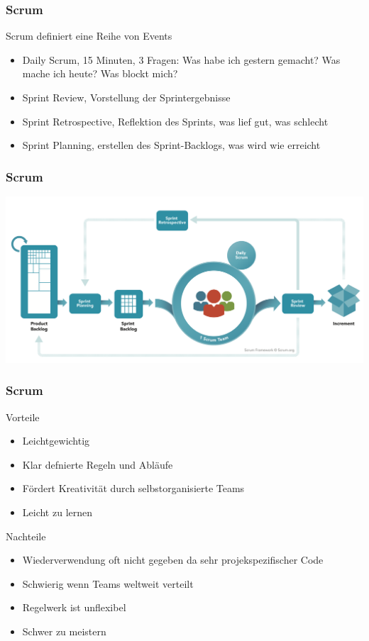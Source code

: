 \begin{frame}
\frametitle{Scrum}
	Scrum definiert eine Reihe von Events
	\begin{itemize}
		\item Daily Scrum, 15 Minuten, 3 Fragen: Was habe ich gestern gemacht? Was mache ich heute? Was blockt mich?
		\item Sprint Review, Vorstellung der Sprintergebnisse
		\item Sprint Retrospective, Reflektion des Sprints, was lief gut, was schlecht
		\item Sprint Planning, erstellen des Sprint-Backlogs, was wird wie erreicht
	\end{itemize}
\end{frame}

\begin{frame}
\frametitle{Scrum}
	\center\includegraphics[width=1\textwidth,
		keepaspectratio=true]{bilder/scrum.png}
\end{frame}

\begin{frame}
\frametitle{Scrum}
	Vorteile
	\begin{itemize}
		\item Leichtgewichtig
		\item Klar defnierte Regeln und Abläufe
		\item Fördert Kreativität durch selbstorganisierte Teams
		\item Leicht zu lernen
	\end{itemize}
	\bigskip
	Nachteile
	\begin{itemize}
		\item Wiederverwendung oft nicht gegeben da sehr projekspezifischer Code
		\item Schwierig wenn Teams weltweit verteilt
		\item Regelwerk ist unflexibel
		\item Schwer zu meistern
	\end{itemize}
\end{frame}

